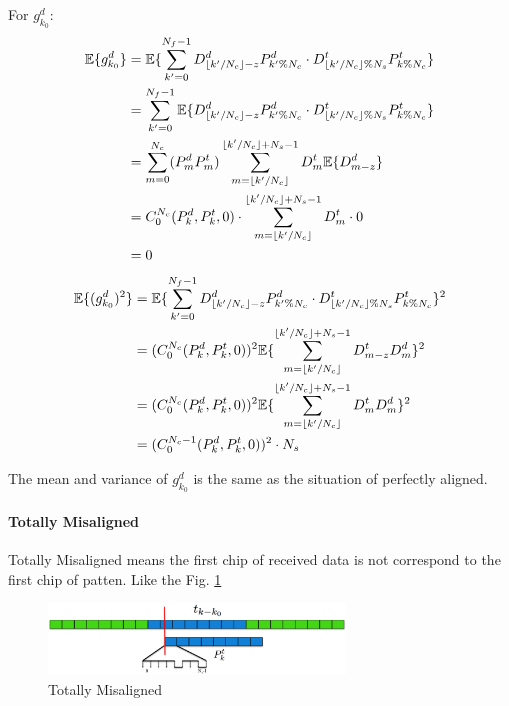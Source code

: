 \documentclass[a4paper]{report}
\DeclarePairedDelimiter\floor{\lfloor}{\rfloor}
\begin{document}
For $g^d_{k_0}$: \label{eq:chip-level aligned-data}
\begin{align}
	\mathbb{E} \{g^d_{k_0}\} 
	&= \mathbb{E} \{\sum_{k'=0}^{N_f-1} D^d_{\floor{k'/N_c}-z} P^d_{k'\%N_c} \cdot D^t_{\floor{k'/N_c}\%N_s} P^t_{k\%N_c} \}\\
	&= \sum_{k'=0}^{N_f-1} \mathbb{E} \{ D^d_{\floor{k'/N_c}-z} P^d_{k'\%N_c} \cdot D^t_{\floor{k'/N_c}\%N_s} P^t_{k\%N_c} \}\\
	&= \sum_{m = 0}^{N_c} (P^d_{m} P^t_{m}) \sum_{m = \floor{k'/N_c}}^{\floor{k'/N_c}+N_s-1} D^t_{m} \mathbb{E}\{ D^d_{m-z} \}\\
	&= C_0^{N_c}(P_k^d, P_k^t, 0) \cdot \sum_{m = \floor{k'/N_c}}^{\floor{k'/N_c}+N_s-1} D^t_{m} \cdot0\\
	&= 0
\end{align}
\begin{align}
	\mathbb{E} \{(g^d_{k_0})^2\}
	&= \mathbb{E} \{\sum_{k'=0}^{N_f-1} D^d_{\floor{k'/N_c}-z} P^d_{k'\%N_c} \cdot D^t_{\floor{k'/N_c}\%N_s} P^t_{k\%N_c} \}^2\\
	&= (C_0^{N_c}(P_k^d, P_k^t, 0))^2 \mathbb{E}\{\sum_{m = \floor{k'/N_c}}^{\floor{k'/N_c}+N_s-1} D_{m-z}^t D_{m}^d \}^2\\
	&= (C_0^{N_c}(P_k^d, P_k^t, 0))^2 \mathbb{E}\{\sum_{m = \floor{k'/N_c}}^{\floor{k'/N_c}+N_s-1} D_{m}^t D_{m}^d \}^2\\
	&= (C_0^{N_c-1}(P^d_{k}, P^t_{k}, 0))^2 \cdot N_s
\end{align}

The mean and variance of $g^d_{k_0}$ is the same as the situation of perfectly aligned.

\paragraph{Totally Misaligned} %
\label{par:totally_misaligned}
Totally Misaligned means the first chip of received data is not correspond to the first chip of patten. Like the Fig. \ref{fig:Totally Misaligned}
\begin{figure}[ht]
	\centering
	\includegraphics[width = 3.1in]{figure/totally_misaligned.png}
	\caption{Totally Misaligned}
	\label{fig:Totally Misaligned}
\end{figure}
\end{document}
